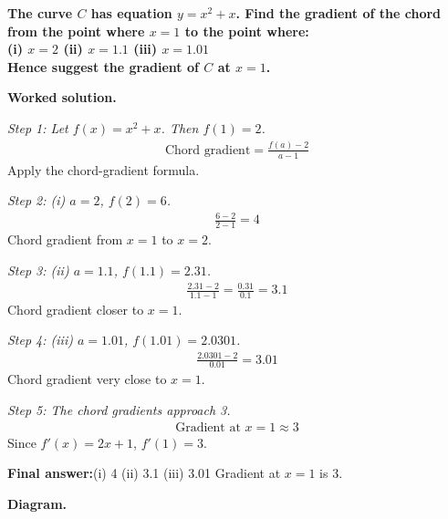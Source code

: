\documentclass[11pt]{article}
\newcommand{\question}[1]{\par\medskip\noindent\textbf{#1}\par}
\begin{document}
\question{The curve \( C \) has equation \( y = x^2 + x \). Find the gradient of the chord from the point where \( x = 1 \) to the point where:\\[3pt]  (i) \( x = 2 \) \quad  (ii) \( x = 1.1 \) \quad  (iii) \( x = 1.01 \)\\[3pt]  Hence suggest the gradient of \( C \) at \( x = 1 \).}

\textbf{Worked solution.}

\textit{Step 1: Let \( f(x) = x^2 + x \). Then \( f(1) = 2 \).}
\[\begin{gathered}
\text{Chord gradient} = \frac{f(a) - 2}{a - 1}
\end{gathered}\]
Apply the chord-gradient formula.

\textit{Step 2: (i) \( a = 2 \), \( f(2) = 6 \).}
\[\begin{gathered}
\frac{6 - 2}{2 - 1} = 4
\end{gathered}\]
Chord gradient from \( x = 1 \) to \( x = 2 \).

\textit{Step 3: (ii) \( a = 1.1 \), \( f(1.1) = 2.31 \).}
\[\begin{gathered}
\frac{2.31 - 2}{1.1 - 1} = \frac{0.31}{0.1} = 3.1
\end{gathered}\]
Chord gradient closer to \( x = 1 \).

\textit{Step 4: (iii) \( a = 1.01 \), \( f(1.01) = 2.0301 \).}
\[\begin{gathered}
\frac{2.0301 - 2}{0.01} = 3.01
\end{gathered}\]
Chord gradient very close to \( x = 1 \).

\textit{Step 5: The chord gradients approach 3.}
\[\begin{gathered}
\text{Gradient at } x = 1 \approx 3
\end{gathered}\]
Since \( f'(x) = 2x + 1 \), \( f'(1) = 3 \).

\begin{answerbox}
\textbf{Final answer:}\quad (i) 4 \quad  (ii) 3.1 \quad  (iii) 3.01 \quad  Gradient at \(\displaystyle  x = 1 \) is 3.
\end{answerbox}
\textbf{Diagram.}
\end{document}
